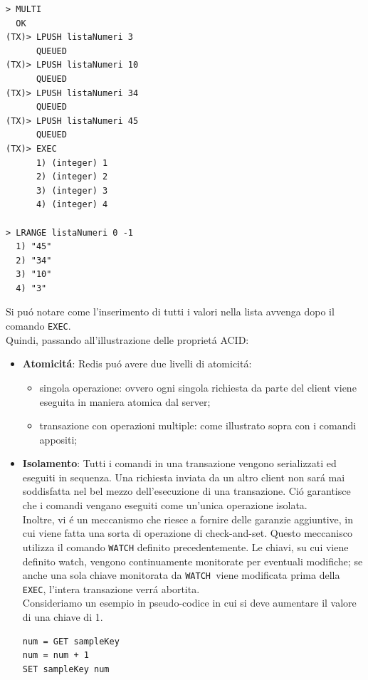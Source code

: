 \begin{lstlisting}[autogobble]
> MULTI
  OK
(TX)> LPUSH listaNumeri 3
      QUEUED
(TX)> LPUSH listaNumeri 10
      QUEUED
(TX)> LPUSH listaNumeri 34
      QUEUED
(TX)> LPUSH listaNumeri 45
      QUEUED
(TX)> EXEC
      1) (integer) 1
      2) (integer) 2
      3) (integer) 3
      4) (integer) 4

> LRANGE listaNumeri 0 -1
  1) "45"
  2) "34"
  3) "10"
  4) "3"\end{lstlisting}
Si puó notare come l'inserimento di tutti i valori nella lista avvenga dopo il comando \texttt{EXEC}.\\

Quindi, passando all'illustrazione delle proprietá ACID:
\begin{itemize}
    \item \textbf{Atomicitá}: Redis puó avere due livelli di atomicitá:
      \begin{itemize}
          \item singola operazione: ovvero ogni singola richiesta da parte del client viene eseguita in maniera atomica dal server;
          \item transazione con operazioni multiple: come illustrato sopra con i comandi appositi;
      \end{itemize}

    \item \textbf{Isolamento}:
    Tutti i comandi in una transazione vengono serializzati ed eseguiti in sequenza. Una richiesta inviata da un altro client
    non sará mai soddisfatta nel bel mezzo dell'esecuzione di una transazione. Ció garantisce che i comandi vengano eseguiti
    come un'unica operazione isolata.\\
    Inoltre, vi é un meccanismo che riesce a fornire delle garanzie aggiuntive, in cui viene fatta una sorta di operazione
    di check-and-set.
    Questo meccanisco utilizza il comando \texttt{WATCH} definito precedentemente.
    Le chiavi, su cui viene definito watch, vengono continuamente monitorate per eventuali modifiche; se anche una sola chiave monitorata
    da \texttt{WATCH }viene modificata prima della \texttt{EXEC}, l'intera transazione verrá abortita.\\

    Consideriamo un esempio in pseudo-codice in cui si deve aumentare il valore di una chiave di 1.

    \begin{lstlisting}[autogobble]
num = GET sampleKey
num = num + 1
SET sampleKey num\end{lstlisting}


\end{itemize}
